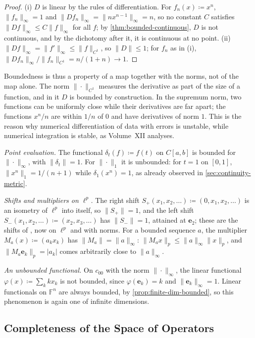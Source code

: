 \begin{proof}
(i) $D$ is linear by the rules of differentiation. For $f_n(x)\coloneqq x^n$, $\|f_n\|_\infty=1$ and $\|Df_n\|_\infty=\|nx^{n-1}\|_\infty=n$, so no constant $C$ satisfies $\|Df\|_\infty\le C\|f\|_\infty$ for all $f$; by \cref{thm:bounded-continuous}, $D$ is not continuous, and by the dichotomy after it, it is continuous at no point. (ii) $\|Df\|_\infty=\|f'\|_\infty\le\|f\|_{C^1}$, so $\|D\|\le1$; for $f_n$ as in (i), $\|Df_n\|_\infty/\|f_n\|_{C^1}=n/(1+n)\to1$.
\end{proof}

Boundedness is thus a property of a map together with the norms, not of the map alone. The norm $\|\cdot\|_{C^1}$ measures the derivative as part of the size of a function, and in it $D$ is bounded by construction. In the supremum norm, two functions can be uniformly close while their derivatives are far apart; the functions $x^n/n$ are within $1/n$ of $0$ and have derivatives of norm $1$. This is the reason why numerical differentiation of data with errors is unstable, while numerical integration is stable, as Volume~XII analyses.

\emph{Point evaluation.} The functional $\delta_t(f)\coloneqq f(t)$ on $C[a,b]$ is bounded for $\|\cdot\|_\infty$, with $\|\delta_t\|=1$. For $\|\cdot\|_1$ it is unbounded: for $t=1$ on $[0,1]$, $\|x^n\|_1=1/(n+1)$ while $\delta_1(x^n)=1$, as already observed in \cref{sec:continuity-metric}.

\emph{Shifts and multipliers on $\ell^p$.} The right shift $S_+(x_1,x_2,\ldots)\coloneqq(0,x_1,x_2,\ldots)$ is an isometry of $\ell^p$ into itself, so $\|S_+\|=1$, and the left shift $S_-(x_1,x_2,\ldots)\coloneqq(x_2,x_3,\ldots)$ has $\|S_-\|=1$, attained at $\mathbf e_2$; these are the shifts of , now on $\ell^p$ and with norms. For a bounded sequence $a$, the multiplier $M_a(x)\coloneqq(a_kx_k)$ has $\|M_a\|=\|a\|_\infty$: $\|M_ax\|_p\le\|a\|_\infty\|x\|_p$, and $\|M_a\mathbf e_k\|_p=|a_k|$ comes arbitrarily close to $\|a\|_\infty$.

\emph{An unbounded functional.} On $c_{00}$ with the norm $\|\cdot\|_\infty$, the linear functional $\varphi(x)\coloneqq\sum_kkx_k$ is not bounded, since $\varphi(\mathbf e_k)=k$ and $\|\mathbf e_k\|_\infty=1$. Linear functionals on $\mathbb F^n$ are always bounded, by \cref{prop:finite-dim-bounded}, so this phenomenon is again one of infinite dimensions.

\subsection{Completeness of the Space of Operators}

